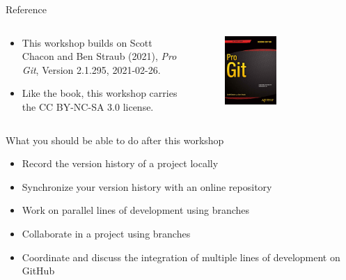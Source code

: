\documentclass[handout]{beamer}
\begin{document}
\begin{frame}{Reference}
  \begin{columns}
  
    \begin{column}{0.5\textwidth}
    \begin{itemize}
      \item This workshop builds on Scott Chacon and Ben Straub (2021), \textit{Pro Git}, Version 2.1.295, 2021-02-26. 
      \item Like the book, this workshop carries the CC BY-NC-SA 3.0 license. 
    \end{itemize}
		\end{column}
		
    \begin{column}{0.5\textwidth}
      \begin{figure}
	      \includegraphics[width=0.5\textwidth]{figures/progit_cover.png}
	      \caption{}
      \end{figure}
    \end{column}
  \end{columns}
\end{frame}

\begin{frame}{What you should be able to do after this workshop}
\begin{itemize}
	\item Record the version history of a project locally
	\item Synchronize your version history with an online repository
	\item Work on parallel lines of development using branches
	\item Collaborate in a project using branches
	\item Coordinate and discuss the integration of multiple lines of development on GitHub
\end{itemize}
\end{frame}
\end{document}
